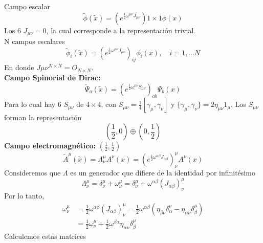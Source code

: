 \documentclass[../main.tex]{subfiles}
\begin{document}
    Campo escalar
    \begin{equation*}
      \tilde{\phi}(\tilde{x}) = \left( e^{\frac{1}{2}\omega^{\mu \nu}J_{\mu \nu}} \right){1 \times 1}\phi(x)
    \end{equation*}
    Los 6 $J_{\mu \nu}=0$, la cual corresponde a la representación trivial. \\
    N campos escalares
    \begin{equation*}
      \tilde{\phi}_i (\tilde{x}) = \left( e^{\frac{1}{2}\omega^{\mu \nu}J_{\mu \nu}} \right)_{ij} \phi_i(x), \quad i=1,\dots N
    \end{equation*}
    En donde $J{\mu \nu}^{N\times N} = O_{N\times N}$. \\
    \textbf{Campo Spinorial de Dirac:}
 \begin{equation*}
   \tilde{\Psi}_a(\tilde{x}) = \left( e^{\frac{1}{2}\omega^{\mu \nu }S_{\mu \nu}} \right)_{ab} \Psi_b(x)
 \end{equation*} 
 Para lo cual hay 6 $S_{\mu \nu}$ de $4\times 4$, con $S_{\mu \nu} = \frac{1}{4} \left[ \gamma_\mu , \gamma_\nu \right]$ y $\{\gamma_\mu , \gamma_\nu\} = 2\eta_{\mu \nu }1_\mu$. Los $S_{\mu\nu}$ forman la representación 
 \begin{equation}
   \left( \frac{1}{2} , 0  \right) \oplus \left( 0,\frac{1}{2} \right)
  \end{equation}
  \textbf{Campo electromagnético:} $ \left( \frac{1}{2}, \frac{1}{2} \right) $
  \begin{equation*}
    \tilde{{A}}^\mu (\tilde{x}) = \Lambda^\mu_\nu A^\nu(x) = \left( e^{\frac{1}{2}\omega^{\alpha \beta}J_{\alpha \beta}} \right)^\mu_\nu A^\nu(x)
  \end{equation*}
  Consideremos que $\Lambda$ es un generador que difiere de la identidad por infinitésimo
 \begin{equation*}
   \Lambda^\mu_\nu = \delta_\nu^\mu + \omega^\mu_\nu  = \delta^\mu_\nu + \omega^{\alpha \beta} \left( J_{\alpha \beta} \right)^\mu_\nu
 \end{equation*} 
 Por lo tanto, 
 \begin{align*}
   \omega^\mu_\nu & = \frac{1}{2}\omega^{\alpha \beta} \left( J_{\alpha \beta} \right)^\mu_\nu = \frac{1}{2}\omega^{\alpha \beta} \left( \eta_{\beta \nu} \delta^\nu_\alpha - \eta_{\alpha \nu}\delta^{\mu}_\beta  \right) \\
   & = \frac{1}{2}\omega^\mu_\nu + \frac{1}{2}\omega^{\beta \alpha} \eta_{\alpha \nu} \delta^\mu_\beta
 \end{align*}
 Calculemos estas matrices
\end{document}
